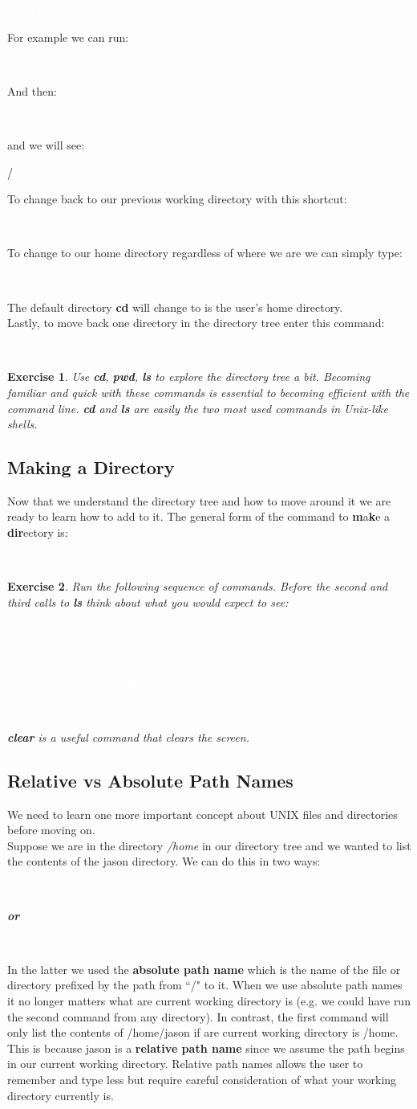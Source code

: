 \documentclass[oneside]{book}
\newcommand{\commandline}[1]{\begin{center} \colorbox{Dark}{\textcolor{white}{#1}} \end{center}}
\newcommand{\exampleout}[1]{\begin{center} \colorbox{Light}{\textcolor{black}{#1}} \end{center}}
\newtheorem{ex}{Exercise}[chapter]
\begin{document}
\commandline{cd dirToChangeTo}
For example we can run:
\commandline{cd /}
And then:
\commandline{pwd}
and we will see:
\exampleout{/}
To change back to our previous working directory with this shortcut:
\commandline{cd -}
To change to our home directory regardless of where we are we can simply type:
\commandline{cd}
The default directory \textbf{cd} will change to is the user's home directory. \\
Lastly, to move back one directory in the directory tree enter this command:
\commandline{cd ../}

\begin{ex}
	Use \textbf{cd}, \textbf{pwd}, \textbf{ls} to explore the directory tree a bit. Becoming familiar and quick with these commands is essential to becoming efficient with the command line. \textbf{cd} and \textbf{ls} are easily the two most used commands in Unix-like shells.
\end{ex}
	
\subsection{Making a Directory}
Now that we understand the directory tree and how to move around it we are ready to learn how to add to it. The general form of the command to \textbf{m}a\textbf{k}e a \textbf{dir}ectory is:
\commandline{mkdir newdirname1 newdirname2 ...}
\begin{ex}
	Run the following sequence of commands. Before the second and third calls to \textbf{ls} think about what you would expect to see:
\commandline{mkdir FirstDir SecondDir}
\commandline{ls}
\commandline{mkdir FirstDir/Foo FirstDir/Foo2}
\commandline{ls FirstDir}
\textbf{clear} is a useful command that clears the screen.
\end{ex}	

\subsection{Relative vs Absolute Path Names}
We need to learn one more important concept about UNIX files and directories before moving on. \\
Suppose we are in the directory \textit{/home} in our directory tree and we wanted to list the contents of the jason directory. We can do this in two ways:
\commandline{ls jason}
\begin{center}
    \textbf{\textit{or}}
\end{center}
\commandline{ls /home/jason}
In the latter we used the \textbf{absolute path name} which is the name of the file or directory prefixed by the path from ``/" to it. When we use absolute path names it no longer matters what are current working directory is (e.g. we could have run the second command from any directory). In contrast, the first command will only list the contents of /home/jason if are current working directory is /home. This is because jason is a \textbf{relative path name} since we assume the path begins in our current working directory. Relative path names allows the user to remember and type less but require careful consideration of what your working directory currently is. 
\end{document}
